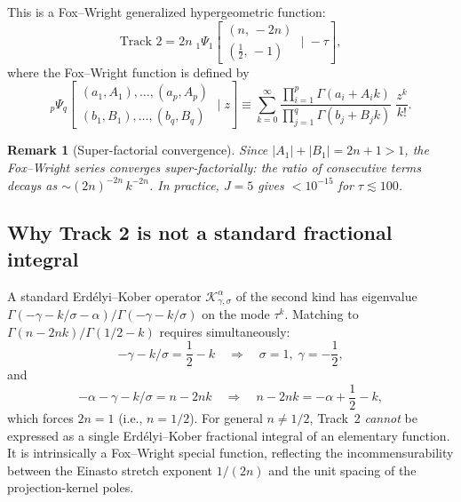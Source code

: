 \documentclass{article}
\newtheorem{remark}{Remark}
\begin{document}
This is a Fox--Wright generalized hypergeometric function:
\begin{equation}\label{eq:fox-wright}
\boxed{\;
\text{Track 2} = 2n\;{}_1\Psi_1\!\left[
\begin{array}{c}(n,\,-2n)\\({\textstyle\frac12},\,-1)\end{array}
\;\bigg|\;-\tau\right],
\;}
\end{equation}
where the Fox--Wright function is defined by
\begin{equation}
{}_p\Psi_q\!\left[
\begin{array}{c}(a_1,A_1),\ldots,(a_p,A_p)\\
(b_1,B_1),\ldots,(b_q,B_q)\end{array}\;\bigg|\;z\right]
\equiv \sum_{k=0}^\infty
\frac{\prod_{i=1}^p\Gamma(a_i+A_i k)}
     {\prod_{j=1}^q\Gamma(b_j+B_j k)}\;\frac{z^k}{k!}.
\end{equation}

\begin{remark}[Super-factorial convergence]
Since $|A_1|+|B_1| = 2n+1 > 1$, the Fox--Wright series converges
super-factorially: the ratio of consecutive terms decays as
$\sim(2n)^{-2n}\,k^{-2n}$. In practice, $J=5$ gives $<10^{-15}$ for
$\tau\lesssim100$.
\end{remark}

\subsection{Why Track 2 is not a standard fractional integral}

A standard Erd\'elyi--Kober operator $\mathcal{K}^{\alpha}_{\gamma,\sigma}$
of the second kind has eigenvalue
$\Gamma(-\gamma-k/\sigma-\alpha)/\Gamma(-\gamma-k/\sigma)$ on the mode
$\tau^k$. Matching to $\Gamma(n-2nk)/\Gamma(1/2-k)$ requires simultaneously:
\[
-\gamma-k/\sigma = {\textstyle\frac12}-k
\quad\Longrightarrow\quad \sigma=1,\;\gamma=-{\textstyle\frac12},
\]
and
\[
-\alpha-\gamma-k/\sigma = n-2nk
\quad\Longrightarrow\quad n-2nk = -\alpha+{\textstyle\frac12}-k,
\]
which forces $2n=1$ (i.e., $n=1/2$). For general $n\neq 1/2$, Track~2
\emph{cannot} be expressed as a single Erd\'elyi--Kober fractional integral of
an elementary function. It is intrinsically a Fox--Wright special function,
reflecting the incommensurability between the Einasto stretch exponent $1/(2n)$
and the unit spacing of the projection-kernel poles.

\end{document}
